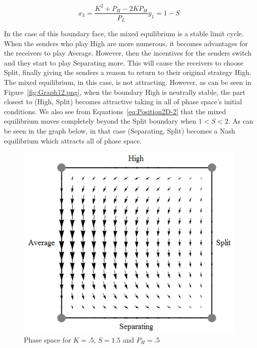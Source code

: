 \documentclass[a4paper,10pt]{article}
\numberwithin{equation}{section}
\begin{document}
\begin{subequations}
\label{eq:Position2D-2}
\begin{equation}
x_3=\frac{K^2+P_H-2 K P_H}{P_L}
\end{equation}
\begin{equation}
y_1=1-S
\end{equation}
\end{subequations}

In the case of this boundary face, the mixed equilibrium is a stable limit cycle. When the senders who play High are more numerous, it becomes advantages for the receivers to play Average. However, then the incentives for the senders switch and they start to play Separating more. This will cause the receivers to choose Split, finally giving the senders a reason to return to their original strategy High. The mixed equilibrium, in this case, is not attracting. However, as can be seen in Figure~\ref{fig:Graph12.png}, when the boundary High is neutrally stable, the part closest to (High, Split) becomes attractive taking in all of phase space's initial conditions. We also see from Equations~\ref{eq:Position2D-2} that the mixed equilibrium moves completely beyond the Split boundary when $1<S<2$. As can be seen in the graph below, in that case (Separating, Split) becomes a Nash equilibrium which attracts all of phase space.

\begin{figure}[h]
\begin{center}
\leavevmode
\includegraphics[scale=.4]{Graph14.png}
\end{center}
\caption{Phase space for $K=.5$, $S=1.5$ and $P_H=.5$}
\label{fig:Graph14.png}
\end{figure}
\end{document}
